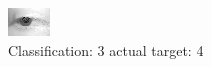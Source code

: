 \begin{figure}[h!]
\begin{center}
\includegraphics[width=0.60\columnwidth]{figures/ID2707_class_3_target_4.png}
\end{center}
\caption{ Classification: 3 actual target: 4}
\label{fig:ID2707_class_3_target_4}
\end{figure}
